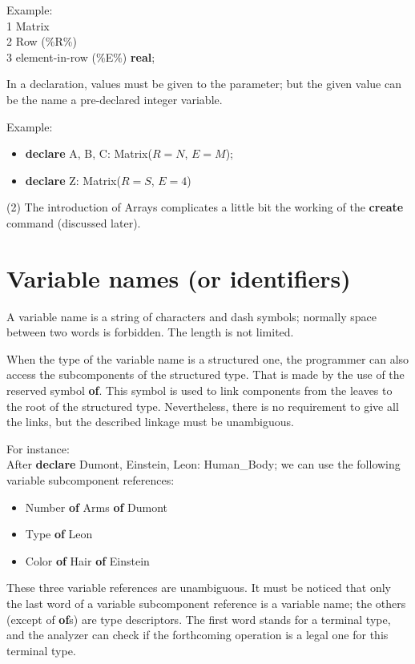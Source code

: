 \documentclass[openany,nobib]{tufte-book}
\newcommand{\kw}[1]{{\bf #1}}
\begin{document}
Example:\\
1 \quad Matrix\\
\-\hspace{1cm}2 \quad Row (\%R\%)\\
\-\hspace{2cm}3 \quad element-in-row (\%E\%) \kw{real};

In a declaration, values must be given to the parameter; but the given value
can be the name a pre-declared integer variable.

Example:
\begin{itemize}
    \item[] \kw{declare} A, B, C: Matrix($R=N$, $E=M$);
    \item[] \kw{declare} Z: Matrix($R=S$, $E=4$)
\end{itemize}
(2) The introduction of Arrays complicates a little bit the working of the
\kw{create} command (discussed later).

\section{Variable names (or identifiers)}

A variable name is a string of characters and dash symbols; normally space
between two words is forbidden. The length is not limited.

When the type of the variable name is a structured one, the programmer can also
access the subcomponents of the structured type. That is made by the use of the
reserved symbol \kw{of}. This symbol is used to link components from the
leaves to the root of the structured type. Nevertheless, there is no
requirement to give all the links, but the described linkage must be
unambiguous.

For instance:\\
After \kw{declare} Dumont, Einstein, Leon: Human\_Body; we can use the
following variable subcomponent references:
\begin{itemize}
    \item[] Number \kw{of} Arms \kw{of} Dumont
    \item[] Type \kw{of} Leon
    \item[] Color \kw{of} Hair \kw{of} Einstein
\end{itemize}
These three variable references are unambiguous. It must be noticed that only
the last word of a variable subcomponent reference is a variable name; the
others (except of \kw{of}s) are type descriptors. The first word stands for a
terminal type, and the analyzer can check if the forthcoming operation is a
legal one for this terminal type.
\end{document}
